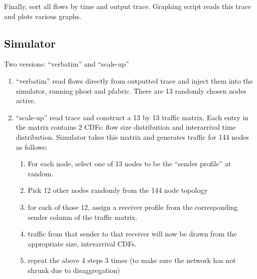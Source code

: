 Finally, sort all flows by time and output trace.
Graphing script reads this trace and plots various graphs.

\subsection{Simulator}
Two versions: ``verbatim'' and ``scale-up''
\begin{enumerate}
\item ``verbatim'' read flows directly from outputted trace and inject them into the simulator, running phost and pfabric. There are 13 randomly chosen nodes active.
\item ``scale-up'' read trace and construct a 13 by 13 traffic matrix. Each entry in the matrix contains 2 CDFs: flow size distribution and interarrival time distribution. Simulator takes this matrix and generates traffic for 144 nodes as follows:
    \begin{enumerate}
    \item For each node, select one of 13 nodes to be the ``sender profile'' at random.
    \item Pick 12 other nodes randomly from the 144 node topology
    \item for each of those 12, assign a receiver profile from the corresponding sender column of the traffic matrix.
    \item traffic from that sender to that receiver will now be drawn from the appropriate size, interarrival CDFs.
    \item repeat the above 4 steps 3 times (to make sure the network has not shrunk due to disaggregation)
    \end{enumerate}
\end{enumerate}